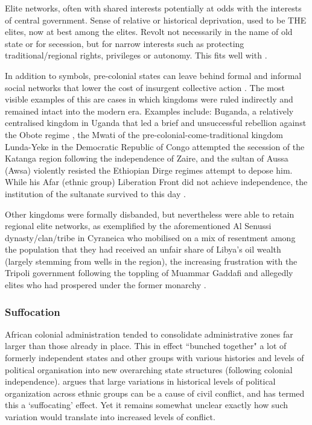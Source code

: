 \documentclass[12pt]{article}
\begin{document}
Elite networks, often with shared interests potentially at odds with the
interests of central government. Sense of relative or historical deprivation,
used to be THE elites, now at best among the elites. Revolt not necessarily in
the name of old state or for secession, but for narrow interests such as
protecting traditional/regional rights, privileges or autonomy. This fits well
with \citet{Ying_2020}.

In addition to symbols, pre-colonial states can leave behind formal and informal
social networks that lower the cost of insurgent collective action
\citep{Wig2016, Wood2000}. The most visible examples of this are cases in which
kingdoms were ruled indirectly and remained intact into the modern era. Examples
include: Buganda, a relatively centralised kingdom in Uganda that led a brief
and unsuccessful rebellion against the Obote regime \citep{Tuck2005}, the Mwati
of the pre-colonial-come-traditional kingdom Lunda-Yeke in the Democratic
Republic of Congo attempted the secession of the Katanga region following the
independence of Zaire, and the sultan of Aussa (Awsa) violently resisted the
Ethiopian Dirge regimes attempt to depose him. While his Afar (ethnic group)
Liberation Front did not achieve independence, the institution of the sultanate
survived to this day \citep{Shehim1985, Hanfare2011}.

Other kingdoms were formally disbanded, but nevertheless were able to retain
regional elite networks, as exemplified by the aforementioned Al Senussi
dynasty/clan/tribe in Cyraneica who mobilised on a mix of resentment among the
population that they had received an unfair share of Libya's oil wealth (largely
stemming from wells in the region), the increasing frustration with the
Tripoli government following the toppling of Muammar Gaddafi and allegedly
elites who had prospered under the former monarchy \citep{Fetouri2012}.

\subsubsection{Suffocation}

African colonial administration tended to consolidate administrative zones far
larger than those already in place. This in effect ``bunched together" a lot of
formerly independent states and other groups with various histories and levels
of political organisation into new overarching state structures (following
colonial independence). \citet{Englebert2002} argues that large variations in
historical levels of political organization across ethnic groups can be a cause
of civil conflict, and has termed this a `suffocating' effect. Yet it remains
somewhat unclear exactly how such variation would translate into increased
levels of conflict. 
\end{document}
